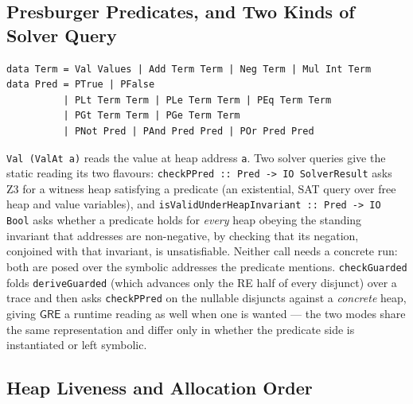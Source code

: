 \documentclass[acmsmall,screen]{acmart}
\newcommand{\GRE}{\mathsf{GRE}}
\begin{document}
\subsection{Presburger Predicates, and Two Kinds of Solver Query}

\begin{lstlisting}
data Term = Val Values | Add Term Term | Neg Term | Mul Int Term
data Pred = PTrue | PFalse
          | PLt Term Term | PLe Term Term | PEq Term Term
          | PGt Term Term | PGe Term Term
          | PNot Pred | PAnd Pred Pred | POr Pred Pred
\end{lstlisting}
\lstinline{Val (ValAt a)} reads the value at heap address \lstinline{a}.
Two solver queries give the static reading its two flavours:
\lstinline{checkPPred :: Pred -> IO SolverResult} asks Z3 for a witness heap
satisfying a predicate (an existential, SAT query over free heap and
value variables), and \lstinline{isValidUnderHeapInvariant :: Pred -> IO Bool}
asks whether a predicate holds for \emph{every} heap obeying the standing
invariant that addresses are non-negative, by checking that its negation,
conjoined with that invariant, is unsatisfiable.
Neither call needs a concrete run: both are posed over the symbolic
addresses the predicate mentions.
\lstinline{checkGuarded} folds \lstinline{deriveGuarded} (which advances
only the RE half of every disjunct) over a trace and then asks
\lstinline{checkPPred} on the nullable disjuncts against a \emph{concrete}
heap, giving $\GRE$ a runtime reading as well when one is wanted --- the two
modes share the same representation and differ only in whether the
predicate side is instantiated or left symbolic.

\subsection{Heap Liveness and Allocation Order}
\label{sec:ex-gre-memory}
\end{document}
